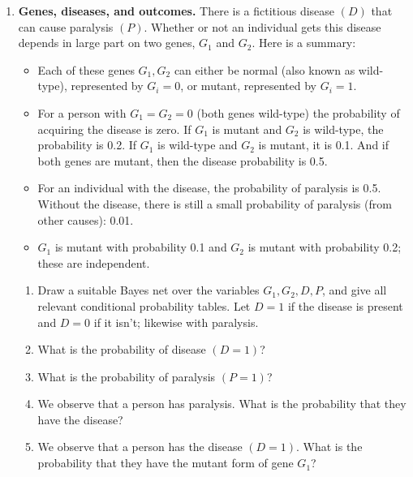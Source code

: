 \documentclass{article}
\begin{document}
\begin{enumerate}
    \begin{center}
    \end{center}

\item \textbf{Genes, diseases, and outcomes.} There is a fictitious disease $(D)$ that can cause paralysis $(P)$. Whether or not an individual gets this disease depends in large part on two genes, $G_1$ and $G_2$. Here is a summary:

    \begin{itemize}
    \item Each of these genes $G_1, G_2$ can either be normal (also known as wild-type), represented by $G_i=0$, or mutant, represented by $G_i=1$.
    \item For a person with $G_1=G_2=0$ (both genes wild-type) the probability of acquiring the disease is zero. If $G_1$ is mutant and $G_2$ is wild-type, the probability is 0.2. If $G_1$ is wild-type and $G_2$ is mutant, it is 0.1. And if both genes are mutant, then the disease probability is 0.5.
    \item For an individual with the disease, the probability of paralysis is 0.5. Without the disease, there is still a small probability of paralysis (from other causes): 0.01.
    \item $G_1$ is mutant with probability 0.1 and $G_2$ is mutant with probability 0.2; these are independent.
    \end{itemize}

    \begin{enumerate}
    \item Draw a suitable Bayes net over the variables $G_1, G_2, D, P$, and give all relevant conditional probability tables. Let $D=1$ if the disease is present and $D=0$ if it isn't; likewise with paralysis.
    \item What is the probability of disease $(D=1)$?
    \item What is the probability of paralysis $(P=1)$?
    \item We observe that a person has paralysis. What is the probability that they have the disease?
    \item We observe that a person has the disease $(D=1)$. What is the probability that they have the mutant form of gene $G_1$?
    \end{enumerate}


\end{enumerate}
\end{document}
